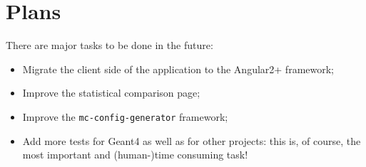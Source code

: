 \section{Plans}
\label{sec-status}

There are major tasks to be done in the future:
\begin{itemize}
	\item Migrate the client side of the application to the Angular2+ framework;
	\item Improve the statistical comparison page;
	\item Improve the {\tt mc-config-generator} framework;
	\item Add more tests for Geant4 as well as for other projects: this is, of course, the most important and (human-)time consuming task!
\end{itemize}